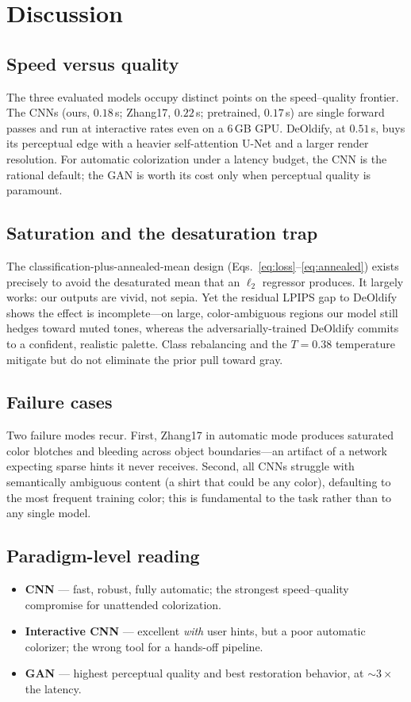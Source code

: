\section{Discussion}
\label{sec:discussion}

\subsection{Speed versus quality}
The three evaluated models occupy distinct points on the speed--quality frontier.
The CNNs (ours, $0.18$\,s; Zhang17, $0.22$\,s; pretrained, $0.17$\,s) are
single forward passes and run at interactive rates even on a $6$\,GB GPU.
DeOldify, at $0.51$\,s, buys its perceptual edge with a heavier
self-attention U-Net and a larger render resolution. For automatic
colorization under a latency budget, the CNN is the rational default; the GAN
is worth its cost only when perceptual quality is paramount.

\subsection{Saturation and the desaturation trap}
The classification-plus-annealed-mean design (Eqs.~\ref{eq:loss}--\ref{eq:annealed})
exists precisely to avoid the desaturated mean that an $\ell_2$ regressor
produces. It largely works: our outputs are vivid, not sepia. Yet the residual
LPIPS gap to DeOldify shows the effect is incomplete---on large, color-ambiguous
regions our model still hedges toward muted tones, whereas the adversarially-trained
DeOldify commits to a confident, realistic palette. Class rebalancing and the
$T=0.38$ temperature mitigate but do not eliminate the prior pull toward gray.

\subsection{Failure cases}
Two failure modes recur. First, Zhang17 in automatic mode produces saturated
color blotches and bleeding across object boundaries---an artifact of a network
expecting sparse hints it never receives. Second, all CNNs struggle with
semantically ambiguous content (a shirt that could be any color), defaulting to
the most frequent training color; this is fundamental to the task rather than to
any single model.

\subsection{Paradigm-level reading}
\begin{itemize}
  \item \textbf{CNN} --- fast, robust, fully automatic; the strongest
        speed--quality compromise for unattended colorization.
  \item \textbf{Interactive CNN} --- excellent \emph{with} user hints, but a poor
        automatic colorizer; the wrong tool for a hands-off pipeline.
  \item \textbf{GAN} --- highest perceptual quality and best restoration
        behavior, at $\sim$$3\times$ the latency.
\end{itemize}

